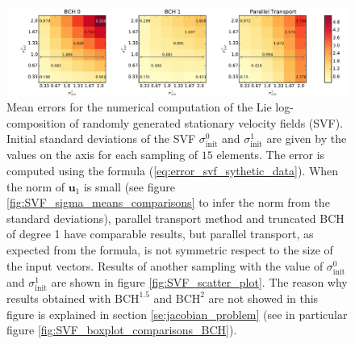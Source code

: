 \begin{figure}[!ht]
	\hspace{-2.1cm}
	\includegraphics[scale=0.55]{figures/SVF_image_scale.pdf}
	\caption{Mean errors for the numerical computation of the Lie log-composition of randomly generated stationary velocity fields (SVF). Initial standard deviations of the SVF $\sigma_{\text{init}}^{0}$ and $\sigma_{\text{init}}^{1}$ are given by the values on the axis for each sampling of $15$ elements. The error is computed using the formula (\ref{eq:error_svf_sythetic_data}). When the norm of $\mathbf{u}_1$ is small (see figure \ref{fig:SVF_sigma_means_comparisons} to infer the norm from the standard deviations), parallel transport method and truncated BCH of degree 1 have comparable results, but parallel transport, as expected from the formula, is not symmetric respect to the size of the input vectors. Results of another sampling with the value of $\sigma_{\text{init}}^{0}$ and $\sigma_{\text{init}}^{1}$ are shown in figure \ref{fig:SVF_scatter_plot}. The reason why results obtained with $\text{BCH}^{1.5}$ and $\text{BCH}^{2}$ are not showed in this figure is explained in section \ref{se:jacobian_problem} (see in particular figure \ref{fig:SVF_boxplot_comparisons_BCH}). 
		}
	\label{fig:SVF_image_scale}
\end{figure}

